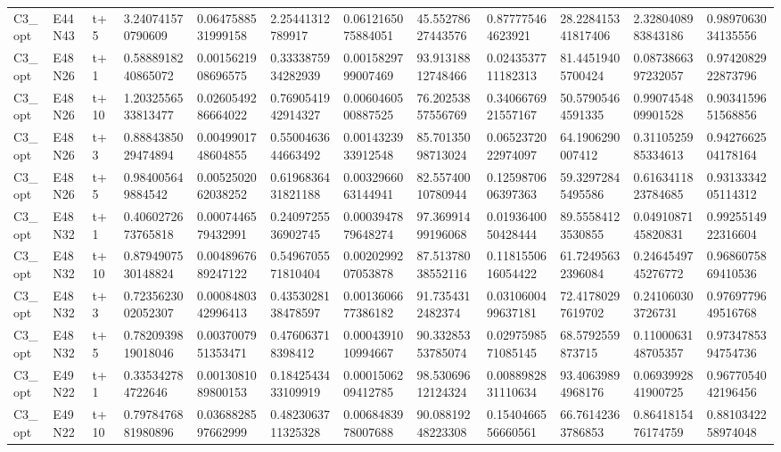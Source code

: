 \begin{landscape}
\begin{longtable}{llllllllllll}
C3\_opt & E44N43 & t+5 & 3.240741570790609 & 0.0647588531999158 & 2.25441312789917 & 0.0612165075884051 & 45.55278627443576 & 0.877775464623921 & 28.228415341817406 & 2.3280408983843186 & 0.9897063034135556 \\
C3\_opt & E48N26 & t+1 & 0.5888918240865072 & 0.0015621908696575 & 0.3333875934282939 & 0.0015829799007469 & 93.91318812748466 & 0.0243537711182313 & 81.44519405700424 & 0.0873866397232057 & 0.9742082922873796 \\
C3\_opt & E48N26 & t+10 & 1.2032556533813477 & 0.0260549286664022 & 0.7690541942914327 & 0.0060460500887525 & 76.20253857556769 & 0.3406676921557167 & 50.57905464591335 & 0.9907454809901528 & 0.9034159651568856 \\
C3\_opt & E48N26 & t+3 & 0.8884385029474894 & 0.0049901748604855 & 0.5500463644663492 & 0.0014323933912548 & 85.70135098713024 & 0.0652372022974097 & 64.1906290007412 & 0.3110525985334613 & 0.9427662504178164 \\
C3\_opt & E48N26 & t+5 & 0.984005649884542 & 0.0052502062038252 & 0.6196836431821188 & 0.0032966063144941 & 82.55740010780944 & 0.1259870606397363 & 59.32972845495586 & 0.6163411823784685 & 0.9313334205114312 \\
C3\_opt & E48N32 & t+1 & 0.4060272673765818 & 0.0007446579432991 & 0.2409725536902745 & 0.0003947879648274 & 97.36991499196068 & 0.0193640050428444 & 89.55584123530855 & 0.0491087145820831 & 0.9925514922316604 \\
C3\_opt & E48N32 & t+10 & 0.8794907530148824 & 0.0048967689247122 & 0.5496705571810404 & 0.0020299207053878 & 87.51378038552116 & 0.1181550616054422 & 61.72495632396084 & 0.2464549745276772 & 0.9686075869410536 \\
C3\_opt & E48N32 & t+3 & 0.7235623002052307 & 0.0008480342996413 & 0.4353028138478597 & 0.0013606677386182 & 91.7354312482374 & 0.0310600499637181 & 72.41780297619702 & 0.241060303726731 & 0.9769779649516768 \\
C3\_opt & E48N32 & t+5 & 0.7820939819018046 & 0.0037007951353471 & 0.476063718398412 & 0.0004391010994667 & 90.33285353785074 & 0.0297598571085145 & 68.5792559873715 & 0.1100063148705357 & 0.9734785394754736 \\
C3\_opt & E49N22 & t+1 & 0.335342784722646 & 0.0013081089800153 & 0.1842543433109919 & 0.0001506209412785 & 98.53069612124324 & 0.0088982831110634 & 93.40639894968176 & 0.0693992841900725 & 0.9677054042196456 \\
C3\_opt & E49N22 & t+10 & 0.7978476881980896 & 0.0368828597662999 & 0.4823063711325328 & 0.0068483978007688 & 90.08819248223308 & 0.1540466556660561 & 66.76142363786853 & 0.8641815476174759 & 0.8810342258974048 \\

\end{longtable}
\end{landscape}
